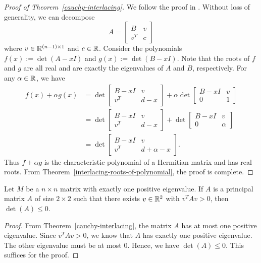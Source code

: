 \documentclass{puthesis-UG}
\begin{document}
\begin{proof}[Proof of Theorem~\ref{cauchy-interlacing}]
	We follow the proof in \cite{fisk}. Without loss of generality, we can decompose 
	\[
		A = \begin{bmatrix}
			B & v \\
			v^T & c
		\end{bmatrix}
	\]
	where $v \in \mathbb{R}^{(n-1) \times 1}$ and $c \in \mathbb{R}$. Consider the polynomials $f(x) := \det (A - xI)$ and $g(x) := \det (B - xI)$. Note that the roots of $f$ and $g$ are all real and are exactly the eigenvalues of $A$ and $B$, respectively. For any $\alpha \in \mathbb{R}$, we have
	\begin{align*}
		f(x) + \alpha g(x) & = \det\begin{bmatrix}
			B-xI & v \\
			v^T & d-x
		\end{bmatrix} + \alpha \det \begin{bmatrix}
			B-xI & v \\
			0 & 1
		\end{bmatrix} \\
		& = \det\begin{bmatrix}
			B-xI & v \\
			v^T & d-x
		\end{bmatrix} + \det \begin{bmatrix}
			B-xI & v \\
			0 & \alpha
		\end{bmatrix} \\
		& = \det \begin{bmatrix}
			B-xI & v \\
			v^T & d+\alpha - x
		\end{bmatrix}.
	\end{align*}
	Thus $f + \alpha g$ is the characteristic polynomial of a Hermitian matrix and has real roots. From Theorem~\ref{interlacing-roots-of-polynomial}, the proof is complete. 
\end{proof}

\begin{cor}
	Let $M$ be a $n \times n$ matrix with exactly one positive eigenvalue. If $A$ is a principal matrix $A$ of size $2 \times 2$ such that there exists $v \in \mathbb{R}^2$ with $v^T A v > 0$, then $\det (A) \leq 0$. 
\end{cor}

\begin{proof}
	From Theorem~\ref{cauchy-interlacing}, the matrix $A$ has at most one positive eigenvalue. Since $v^T A v > 0$, we know that $A$ has exactly one positive eigenvalue. The other eigenvalue must be at most $0$. Hence, we have $\det (A) \leq 0$. This suffices for the proof. 
\end{proof}
\end{document}
